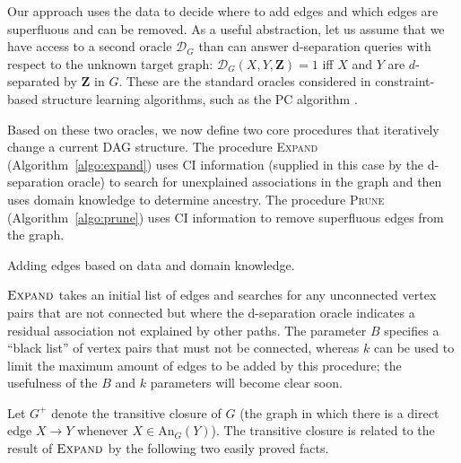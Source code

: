 \documentclass{uai2025} %
\begin{document}
Our approach uses the data to decide where to add edges and which edges 
are superfluous and can be removed.
As a useful abstraction, let us assume that we
have access to a second oracle $\mathcal{D}_G$ than can answer d-separation
queries with respect to the unknown target graph:
$\mathcal{D}_G(X,Y,\mathbf{Z})=1$ iff $X$ and $Y$ are $d$-separated by $\mathbf{Z}$ in 
$G$. These are the standard oracles considered in constraint-based structure
learning algorithms, such as the PC algorithm \cite{Spirtes2001}. 

Based on these two oracles, we now define two core procedures that
iteratively change a current DAG structure. The procedure 
\textsc{Expand} (Algorithm~\ref{algo:expand}) uses CI  
information (supplied in this case by the d-separation oracle) 
to search for unexplained associations in the graph and 
then uses domain knowledge to determine ancestry. The 
procedure \textsc{Prune} (Algorithm~\ref{algo:prune}) uses
CI information to remove superfluous edges from the
graph.

\begin{algorithm}[h]
\DontPrintSemicolon
\SetAlgoLined
{}
\caption{Adding edges based on data and domain knowledge.}
\label{algo:expand}
\end{algorithm}

$\textsc{Expand}$ takes an initial list of edges and searches for 
any unconnected vertex pairs that are not connected but where the
d-separation oracle indicates a residual association not explained 
by other paths.
The parameter $B$ specifies a ``black list''
of vertex pairs that must not be connected, 
whereas $k$
can be used to limit the maximum amount of edges 
to be added by this procedure; the usefulness of the $B$ and $k$
parameters will become clear soon.

Let $G^+$ denote the transitive closure of $G$ (the graph in which 
there is a direct edge $X \to Y$ whenever $X \in \textrm{An}_G(Y)$). 
The transitive closure is related to the result of $\textsc{Expand}$ 
by the following two easily proved facts.
\end{document}
